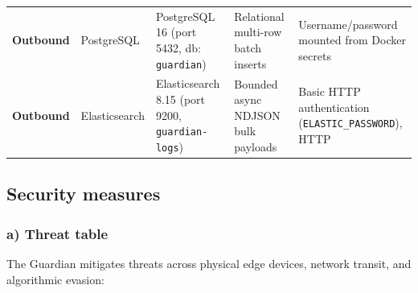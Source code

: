 \documentclass[11pt,a4paper]{article}
\begin{document}
\begin{table}[H]
\begin{tabularx}{\textwidth}{p{1.4cm}p{1.7cm}p{3.6cm}p{3.0cm}X}
\textbf{Outbound} & PostgreSQL & PostgreSQL 16 (port 5432, db: \texttt{guardian}) & Relational multi-row batch inserts & Username/password mounted from Docker secrets \\
\textbf{Outbound} & Elasticsearch & Elasticsearch 8.15 (port 9200, \texttt{guardian-logs}) & Bounded async NDJSON bulk payloads & Basic HTTP authentication (\texttt{ELASTIC\_PASSWORD}), HTTP \\
\bottomrule
\end{tabularx}
\end{table}

\subsection{Security measures}

\subsubsection{a) Threat table}
The Guardian mitigates threats across physical edge devices, network transit, and algorithmic evasion:
\end{document}
